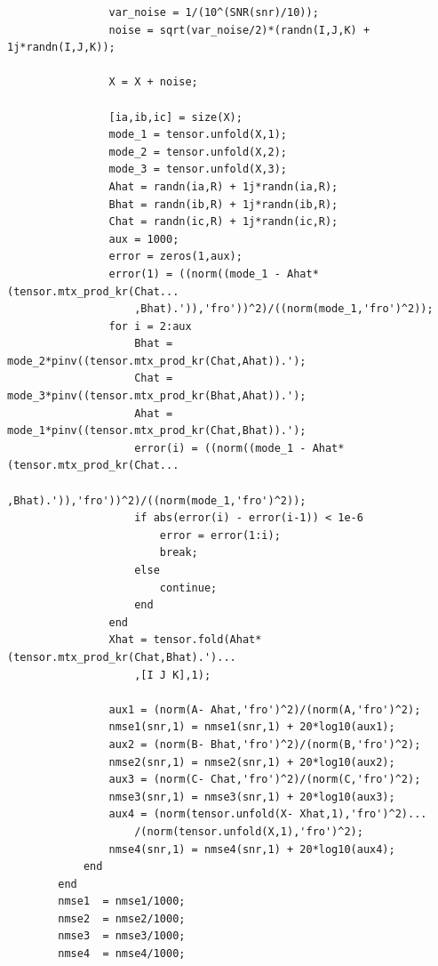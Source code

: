 \documentclass[a4paper,10pt]{article}
\begin{document}
\begin{verbatim}
                var_noise = 1/(10^(SNR(snr)/10));
                noise = sqrt(var_noise/2)*(randn(I,J,K) + 1j*randn(I,J,K));
                
                X = X + noise;
                
                [ia,ib,ic] = size(X);
                mode_1 = tensor.unfold(X,1);
                mode_2 = tensor.unfold(X,2);
                mode_3 = tensor.unfold(X,3);
                Ahat = randn(ia,R) + 1j*randn(ia,R);
                Bhat = randn(ib,R) + 1j*randn(ib,R);
                Chat = randn(ic,R) + 1j*randn(ic,R);
                aux = 1000;
                error = zeros(1,aux);
                error(1) = ((norm((mode_1 - Ahat*(tensor.mtx_prod_kr(Chat...
                    ,Bhat).')),'fro'))^2)/((norm(mode_1,'fro')^2));
                for i = 2:aux
                    Bhat = mode_2*pinv((tensor.mtx_prod_kr(Chat,Ahat)).');
                    Chat = mode_3*pinv((tensor.mtx_prod_kr(Bhat,Ahat)).');
                    Ahat = mode_1*pinv((tensor.mtx_prod_kr(Chat,Bhat)).');
                    error(i) = ((norm((mode_1 - Ahat*(tensor.mtx_prod_kr(Chat...
                        ,Bhat).')),'fro'))^2)/((norm(mode_1,'fro')^2));
                    if abs(error(i) - error(i-1)) < 1e-6
                        error = error(1:i);
                        break;
                    else
                        continue;
                    end
                end
                Xhat = tensor.fold(Ahat*(tensor.mtx_prod_kr(Chat,Bhat).')...
                    ,[I J K],1);
                
                aux1 = (norm(A- Ahat,'fro')^2)/(norm(A,'fro')^2);
                nmse1(snr,1) = nmse1(snr,1) + 20*log10(aux1);
                aux2 = (norm(B- Bhat,'fro')^2)/(norm(B,'fro')^2);
                nmse2(snr,1) = nmse2(snr,1) + 20*log10(aux2);
                aux3 = (norm(C- Chat,'fro')^2)/(norm(C,'fro')^2);
                nmse3(snr,1) = nmse3(snr,1) + 20*log10(aux3);
                aux4 = (norm(tensor.unfold(X- Xhat,1),'fro')^2)...
                    /(norm(tensor.unfold(X,1),'fro')^2);
                nmse4(snr,1) = nmse4(snr,1) + 20*log10(aux4);
            end
        end
        nmse1  = nmse1/1000;
        nmse2  = nmse2/1000;
        nmse3  = nmse3/1000;
        nmse4  = nmse4/1000;


\end{verbatim}
\end{document}
